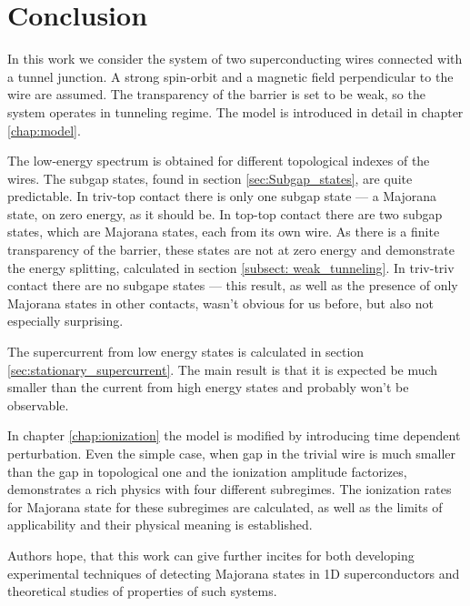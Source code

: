 \chapter{Conclusion}
\label{chap:conclision}
In this work we consider the system of two superconducting wires connected with a tunnel junction. A strong spin-orbit and a magnetic field perpendicular to the wire are assumed. The transparency of the barrier is set to be weak, so the system operates in tunneling regime. The model is introduced in detail in chapter \ref{chap:model}.

The low-energy spectrum is obtained for different topological indexes of the wires. The subgap states, found in section \ref{sec:Subgap_states}, are quite predictable.  In triv-top contact there is only one subgap state --- a Majorana state, on zero energy, as it should be. In top-top contact there are two subgap states, which are Majorana states, each from its own wire. As there is a finite transparency of the barrier, these states are not at zero energy and demonstrate the energy splitting, calculated in section \ref{subsect: weak_tunneling}. In triv-triv contact there are no subgape states --- this result, as well as the presence of only Majorana states in other contacts, wasn't obvious for us before, but also not especially surprising.

The supercurrent from low energy states is calculated in section \ref{sec:stationary_supercurrent}. The main result is that it is expected be much smaller than the current from high energy states and probably won't be observable.

In chapter \ref{chap:ionization} the model is modified by introducing time dependent perturbation. Even the simple case, when gap in the trivial wire is much smaller than the gap in topological one and the ionization amplitude factorizes, demonstrates a rich physics with four different subregimes. The ionization rates for Majorana state for these subregimes are calculated, as well as the limits of applicability and their physical meaning is established.

Authors hope, that this work can give further incites for both developing experimental techniques of detecting Majorana states in 1D superconductors and theoretical studies of properties of such systems.